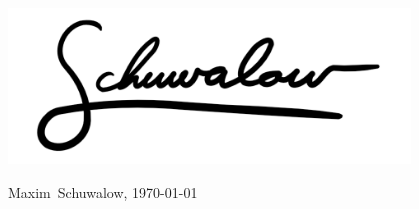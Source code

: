 \documentclass[10pt,a4paper,sans]{moderncv}
\begin{document}
\emptysection{}\closesection
\vfill
\vspace{0.5cm}
\begin{minipage}{0.6\textwidth}
\begin{center}\vspace{-0.1cm}\hspace{-1.3cm}
\\
\end{center}
\end{minipage}
\begin{minipage}{0.4\textwidth}
\begin{center}\vspace{-0.1cm}\hspace{-1.3cm}
\includegraphics[width=0.8\textwidth]{signature}\\
\end{center}
\vspace{-0.5cm}
\hspace{1.1cm} Maxim~Schuwalow, \today
\vspace{0.5cm}
\end{minipage}
\end{document}
